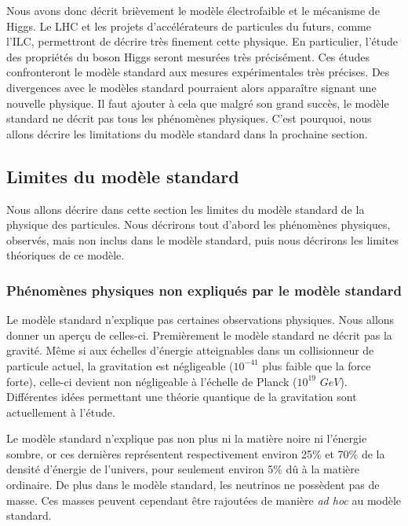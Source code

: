   Nous avons donc d\'ecrit brièvement le mod\`ele \'electrofaible et le m\'ecanisme de Higgs. Le LHC et les projets d'acc\'el\'erateurs de particules du futurs, comme l'ILC, permettront de d\'ecrire tr\`es finement cette physique. En particulier, l'\'etude des propri\'et\'es du boson Higgs seront mesur\'ees tr\`es pr\'ecis\'ement. Ces \'etudes confronteront le mod\`ele standard aux mesures exp\'erimentales tr\`es pr\'ecises. Des divergences avec le mod\`eles standard pourraient alors apparaître signant une nouvelle physique. Il faut ajouter \`a cela que malgr\'e son grand succ\`es, le mod\`ele standard ne d\'ecrit pas tous les ph\'enom\`enes physiques. C'est pourquoi, nous allons d\'ecrire les limitations du mod\`ele standard dans la prochaine section.
  
  \subsection{Limites du mod\`ele standard}
  
  Nous allons d\'ecrire dans cette section les limites du mod\`ele standard de la physique des particules. Nous d\'ecrirons tout d'abord les ph\'enom\`enes physiques, observ\'es, mais non inclus dans le mod\`ele standard, puis nous d\'ecrirons les limites th\'eoriques de ce mod\`ele.
  
  \subsubsection{Ph\'enom\`enes physiques non expliqu\'es par le mod\`ele standard}
  
  Le mod\`ele standard n'explique pas certaines observations physiques. Nous allons donner un aper\c{c}u de celles-ci. Premi\`erement le mod\`ele standard ne décrit pas la gravit\'e. M\^eme si aux \'echelles d'\'energie atteignables dans un collisionneur de particule actuel, la gravitation est n\'egligeable ($10^{-41}$ plus faible que la force forte), celle-ci devient non n\'egligeable \`a l'\'echelle de Planck ($10^{19}$ $GeV$). Diff\'erentes id\'ees permettant une th\'eorie quantique de la gravitation sont actuellement \`a l'\'etude. 
  
  \medskip
  
  Le mod\`ele standard n'explique pas non plus ni la mati\`ere noire ni l'\'energie sombre, or ces derni\`eres repr\'esentent respectivement environ 25\% et 70\% de la densit\'e d'\'energie de l'univers, pour seulement environ 5\% d\^u \`a la mati\`ere ordinaire. De plus dans le mod\`ele standard, les neutrinos ne poss\`edent pas de masse. Ces masses peuvent cependant \^etre rajout\'ees de mani\`ere \textit{ad hoc} au mod\`ele standard. 
  
